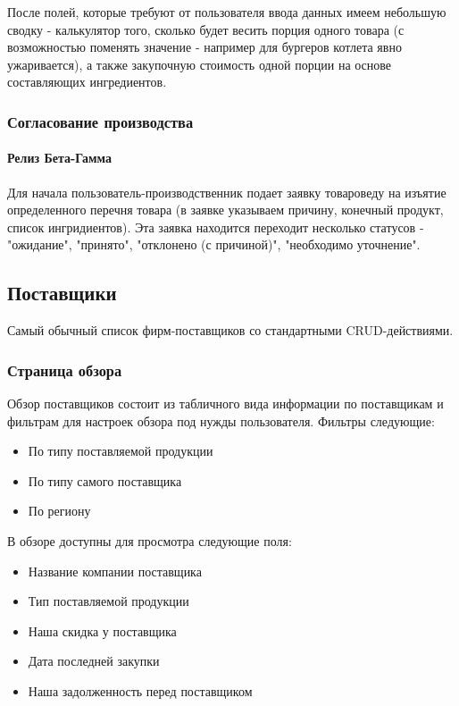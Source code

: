 \documentclass[DIV=calc, paper=a4, fontsize=11pt]{scrartcl} %
\begin{document}
После полей, которые требуют от пользователя ввода данных имеем небольшую сводку - калькулятор того, сколько будет весить порция одного товара (с возможностью поменять значение - например для бургеров котлета явно ужаривается), а также закупочную стоимость одной порции на основе составляющих ингредиентов.

\subsubsection{Согласование производства}

\paragraph{Релиз Бета-Гамма}
Для начала пользователь-производственник подает заявку товароведу на изъятие определенного перечня товара (в заявке указываем причину, конечный продукт, список ингридиентов). Эта заявка находится переходит несколько статусов - "ожидание", "принято", "отклонено (с причиной)", "необходимо уточнение".

\subsection{Поставщики}

Самый обычный список фирм-поставщиков со стандартными CRUD-действиями.

\subsubsection{Страница обзора}

Обзор поставщиков состоит из табличного вида информации по поставщикам и фильтрам для настроек обзора под нужды пользователя. Фильтры следующие:

\begin{itemize}
	\item По типу поставляемой продукции
	\item По типу самого поставщика 
	\item По региону
\end{itemize}

В обзоре доступны для просмотра следующие поля:

\begin{itemize}
	\item Название компании поставщика
	\item Тип поставляемой продукции
	\item Наша скидка у поставщика
	\item Дата последней закупки
	\item Наша задолженность перед поставщиком
\end{itemize}
\end{document}
